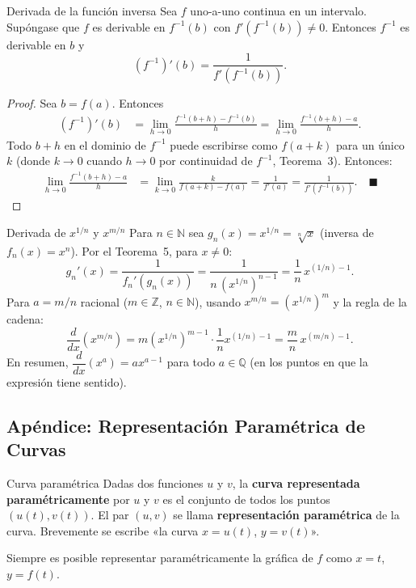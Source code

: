\documentclass[12pt]{article}
\begin{document}
\begin{teorema}[5]{Derivada de la función inversa}
Sea $f$ uno-a-uno continua en un intervalo. Supóngase que $f$ es derivable en $f^{-1}(b)$ con $f'(f^{-1}(b)) \neq 0$. Entonces $f^{-1}$ es derivable en $b$ y
\[ (f^{-1})'(b) = \frac{1}{f'(f^{-1}(b))}. \]
\end{teorema}

\begin{proof}
Sea $b = f(a)$. Entonces
\begin{align*}
(f^{-1})'(b) &= \lim_{h\to 0}\frac{f^{-1}(b+h)-f^{-1}(b)}{h} = \lim_{h\to 0}\frac{f^{-1}(b+h)-a}{h}.
\end{align*}
Todo $b+h$ en el dominio de $f^{-1}$ puede escribirse como $f(a+k)$ para un único $k$ (donde $k\to 0$ cuando $h\to 0$ por continuidad de $f^{-1}$, Teorema~3). Entonces:
\begin{align*}
\lim_{h\to 0}\frac{f^{-1}(b+h)-a}{h} &= \lim_{k\to 0}\frac{k}{f(a+k)-f(a)} = \frac{1}{f'(a)} = \frac{1}{f'(f^{-1}(b))}. \quad \blacksquare
\end{align*}
\end{proof}

\begin{corolario}[]{Derivada de $x^{1/n}$ y $x^{m/n}$}
Para $n \in \mathbb{N}$ sea $g_n(x) = x^{1/n} = \sqrt[n]{x}$ (inversa de $f_n(x) = x^n$). Por el Teorema~5, para $x \neq 0$:
\[ g_n'(x) = \frac{1}{f_n'(g_n(x))} = \frac{1}{n\,(x^{1/n})^{n-1}} = \frac{1}{n}\,x^{(1/n)-1}. \]
Para $a = m/n$ racional ($m \in \mathbb{Z}$, $n \in \mathbb{N}$), usando $x^{m/n} = (x^{1/n})^m$ y la regla de la cadena:
\[ \frac{d}{dx}(x^{m/n}) = m(x^{1/n})^{m-1}\cdot\frac{1}{n}x^{(1/n)-1} = \frac{m}{n}\,x^{(m/n)-1}. \]
En resumen, $\dfrac{d}{dx}(x^a) = ax^{a-1}$ para todo $a \in \mathbb{Q}$ (en los puntos en que la expresión tiene sentido).
\end{corolario}

\subsection{Apéndice: Representación Paramétrica de Curvas}

\begin{definicion}[]{Curva paramétrica}
Dadas dos funciones $u$ y $v$, la \textbf{curva representada paramétricamente} por $u$ y $v$ es el conjunto de todos los puntos $(u(t), v(t))$. El par $(u, v)$ se llama \textbf{representación paramétrica} de la curva. Brevemente se escribe «la curva $x = u(t)$, $y = v(t)$».

Siempre es posible representar paramétricamente la gráfica de $f$ como $x = t$, $y = f(t)$.
\end{definicion}
\end{document}
